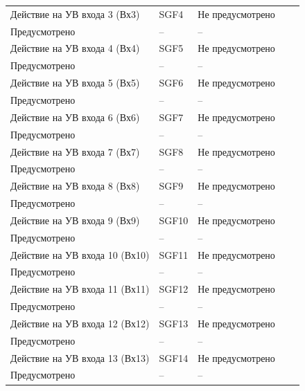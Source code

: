 \begin{longtable}{|>{\centering\arraybackslash}m{5.3cm}|>{\centering\arraybackslash}m{3.3cm}|>{\centering\arraybackslash}m{4.2cm}|>{\centering\arraybackslash}m{1.8cm}|>{\centering\arraybackslash}m{1cm}|}
\hline
\centering Действие на УВ входа 3 (Вх3)  & \centering SGF4 & \centering Не предусмотрено \\ Предусмотрено & \centering -- & \centering \arraybackslash -- \\
\hline
\centering Действие на УВ входа 4 (Вх4)  & \centering SGF5 & \centering Не предусмотрено \\ Предусмотрено & \centering -- & \centering \arraybackslash -- \\
\hline
\centering Действие на УВ входа 5 (Вх5)  & \centering SGF6 & \centering Не предусмотрено \\ Предусмотрено & \centering -- & \centering \arraybackslash -- \\
\hline
\centering Действие на УВ входа 6 (Вх6)  & \centering SGF7 & \centering Не предусмотрено \\ Предусмотрено & \centering -- & \centering \arraybackslash -- \\
\hline
\centering Действие на УВ входа 7 (Вх7)  & \centering SGF8 & \centering Не предусмотрено \\ Предусмотрено & \centering -- & \centering \arraybackslash -- \\
\hline
\centering Действие на УВ входа 8 (Вх8)  & \centering SGF9 & \centering Не предусмотрено \\ Предусмотрено & \centering -- & \centering \arraybackslash -- \\
\hline
\centering Действие на УВ входа 9 (Вх9)  & \centering SGF10 & \centering Не предусмотрено \\ Предусмотрено & \centering -- & \centering \arraybackslash -- \\
\hline
\centering Действие на УВ входа 10 (Вх10)  & \centering SGF11 & \centering Не предусмотрено \\ Предусмотрено & \centering -- & \centering \arraybackslash -- \\
\hline
\centering Действие на УВ входа 11 (Вх11)  & \centering SGF12 & \centering Не предусмотрено \\ Предусмотрено & \centering -- & \centering \arraybackslash -- \\
\hline
\centering Действие на УВ входа 12 (Вх12)  & \centering SGF13 & \centering Не предусмотрено \\ Предусмотрено & \centering -- & \centering \arraybackslash -- \\
\hline
\centering Действие на УВ входа 13 (Вх13)  & \centering SGF14 & \centering Не предусмотрено \\ Предусмотрено & \centering -- & \centering \arraybackslash -- \\

\end{longtable}
